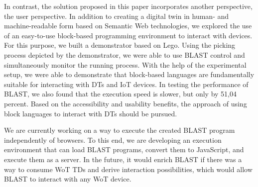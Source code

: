 \documentclass[runningheads]{llncs}
\begin{document}
In contrast, the solution proposed in this paper incorporates another perspective, the user perspective.
In addition to creating a digital twin in human- and machine-readable form based on Semantic Web technologies, we explored the use of an easy-to-use block-based programming environment to interact with devices.
For this purpose, we built a demonstrator based on Lego. Using the picking process depicted by the demonstrator, we were able to use BLAST control and simultaneously monitor the running process.
With the help of the experimental setup, we were able to demonstrate that block-based languages are fundamentally suitable for interacting with DTs and IoT devices.
In testing the performance of BLAST, we also found that the execution speed is slower, but only by 51,04 percent.
Based on the accessibility and usability benefits, the approach of using block languages to interact with DTs should be pursued.

We are currently working on a way to execute the created BLAST program independently of browsers.
To this end, we are developing an execution environment that can load BLAST programs, convert them to JavaScript, and execute them as a server.
In the future, it would enrich BLAST if there was a way to consume WoT TDs and derive interaction possibilities, which would allow BLAST to interact with any WoT device.

%
%
%


%
\end{document}
